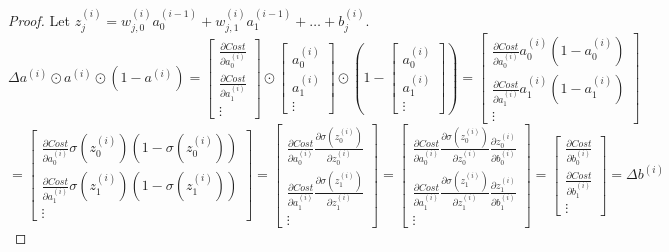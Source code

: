 \documentclass{article}
\theoremstyle{definition}
\theoremstyle{remark}
\theoremstyle{example}
\begin{document}
\begin{proof}
    Let $z^{(i)}_j = w_{j,0}^{(i)} a_0^{(i-1)} + w_{j,1}^{(i)} a_1^{(i-1)} + \dots + b_j^{(i)}$.
    $$\Delta a^{(i)} \odot a^{(i)} \odot (1 - a^{(i)}) =
        \begin{bmatrix}
            \frac{\partial Cost}{\partial a_0^{(i)}}\\
            \frac{\partial Cost}{\partial a_1^{(i)}}\\
            \vdots
        \end{bmatrix} \odot
        \begin{bmatrix}
            a_0^{(i)}\\
            a_1^{(i)}\\
            \vdots
        \end{bmatrix} \odot
        \left(1 - 
        \begin{bmatrix}
            a_0^{(i)}\\
            a_1^{(i)}\\
            \vdots
        \end{bmatrix}\right)
    = \begin{bmatrix}
            \frac{\partial Cost}{\partial a_0^{(i)}} a_0^{(i)}(1 - a_0^{(i)})\\
            \frac{\partial Cost}{\partial a_1^{(i)}} a_1^{(i)}(1 - a_1^{(i)})\\
            \vdots
        \end{bmatrix}$$
    $$= \begin{bmatrix}
            \frac{\partial Cost}{\partial a_0^{(i)}} \sigma(z^{(i)}_0)(1 - \sigma(z^{(i)}_0))\\
            \frac{\partial Cost}{\partial a_1^{(i)}} \sigma(z^{(i)}_1)(1 - \sigma(z^{(i)}_1))\\
            \vdots
        \end{bmatrix}
    = \begin{bmatrix}
            \frac{\partial Cost}{\partial a_0^{(i)}} \frac{\partial \sigma(z^{(i)}_0)}{\partial z^{(i)}_0}\\
            \frac{\partial Cost}{\partial a_1^{(i)}} \frac{\partial \sigma(z^{(i)}_1)}{\partial z^{(i)}_1}\\
            \vdots
        \end{bmatrix}
    = \begin{bmatrix}
            \frac{\partial Cost}{\partial a_0^{(i)}} \frac{\partial \sigma(z^{(i)}_0)}{\partial z^{(i)}_0} \frac{\partial z^{(i)}_0}{\partial b^{(i)}_0}\\
            \frac{\partial Cost}{\partial a_1^{(i)}} \frac{\partial \sigma(z^{(i)}_1)}{\partial z^{(i)}_1} \frac{\partial z^{(i)}_1}{\partial b^{(i)}_1}\\
            \vdots
        \end{bmatrix}
    = \begin{bmatrix}
            \frac{\partial Cost}{\partial b_0^{(i)}}\\
            \frac{\partial Cost}{\partial b_1^{(i)}}\\
            \vdots
        \end{bmatrix}
    = \Delta b^{(i)}$$
\end{proof}
\end{document}
